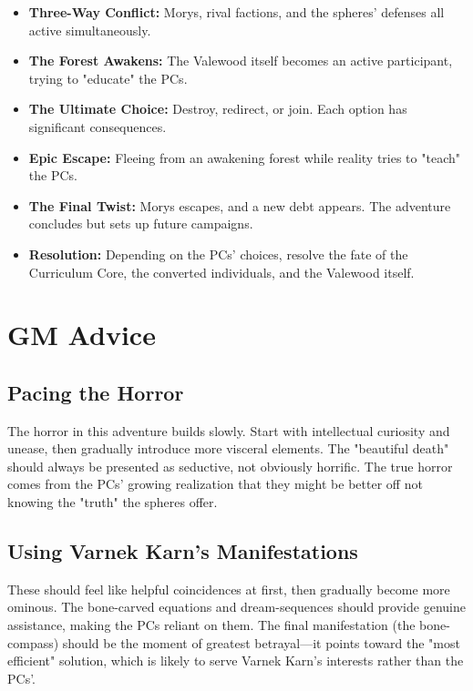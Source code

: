 \documentclass[11pt,twoside]{book}
\newenvironment{adventurebox}[1]{%
  \begin{mdframed}[%
    linewidth=2pt,%
    linecolor=black,%
    backgroundcolor=gray!10,%
    innertopmargin=10pt,%
    innerbottommargin=10pt,%
    innerrightmargin=10pt,%
    innerleftmargin=10pt,%
    frametitle={#1},%
    frametitlefont=\sffamily\bfseries,%
  ]%
}{%
  \end{mdframed}%
}
\newcommand{\sessionbox}[2]{%
  \begin{adventurebox}{Session #1: #2}
}
\newcommand{\endsession}{%
  \end{adventurebox}
}
\begin{document}
\sessionbox{5}{Transcendence or Destruction}
\begin{itemize}
    \item \textbf{Three-Way Conflict:} Morys, rival factions, and the spheres' defenses all active simultaneously.
    \item \textbf{The Forest Awakens:} The Valewood itself becomes an active participant, trying to "educate" the PCs.
    \item \textbf{The Ultimate Choice:} Destroy, redirect, or join. Each option has significant consequences.
    \item \textbf{Epic Escape:} Fleeing from an awakening forest while reality tries to "teach" the PCs.
    \item \textbf{The Final Twist:} Morys escapes, and a new debt appears. The adventure concludes but sets up future campaigns.
    \item \textbf{Resolution:} Depending on the PCs' choices, resolve the fate of the Curriculum Core, the converted individuals, and the Valewood itself.
\end{itemize}
\endsession

\chapter{GM Advice}

\section*{Pacing the Horror}

The horror in this adventure builds slowly. Start with intellectual curiosity and unease, then gradually introduce more visceral elements. The "beautiful death" should always be presented as seductive, not obviously horrific. The true horror comes from the PCs' growing realization that they might be better off not knowing the "truth" the spheres offer.

\section*{Using Varnek Karn's Manifestations}

These should feel like helpful coincidences at first, then gradually become more ominous. The bone-carved equations and dream-sequences should provide genuine assistance, making the PCs reliant on them. The final manifestation (the bone-compass) should be the moment of greatest betrayal---it points toward the "most efficient" solution, which is likely to serve Varnek Karn's interests rather than the PCs'.
\end{document}
